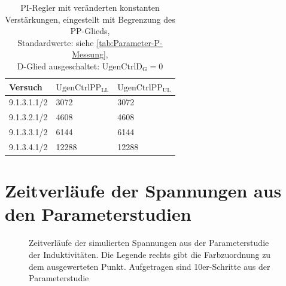 \begin{longtable}[]{lll}
    \caption{PI-Regler mit veränderten konstanten Verstärkungen, eingestellt mit Begrenzung des PP-Glieds,\\Standardwerte: siehe \cref{tab:Parameter-P-Messung},\\D-Glied ausgeschaltet: $\mathrm{UgenCtrlD_G=0}$}
    \label{tab:Parameter-PI-Messung}
    \tabularnewline
    \toprule
    Versuch     & $\mathrm{UgenCtrlPP_{LL}}$ & $\mathrm{UgenCtrlPP_{UL}}$ \\
    \midrule
    \endhead
        9.1.3.1.1/2 & 3072         & 3072  \\
        9.1.3.2.1/2 & 4608         & 4608  \\
        9.1.3.3.1/2 & 6144         & 6144  \\
        9.1.3.4.1/2 & 12288        & 12288 \\
    \bottomrule
\end{longtable}

\section{Zeitverläufe der Spannungen aus den Parameterstudien}
\begin{figure}[!ht]
    \centering
    \begin{subfigure}{\linewidth}
        \centering
        \label{fig:InduktivitatenSweepA}
    \end{subfigure}
    \caption{Zeitverläufe der simulierten Spannungen aus der Parameterstudie der Induktivitäten. Die Legende rechts gibt die Farbzuordnung zu dem ausgewerteten Punkt. Aufgetragen sind 10er-Schritte aus der Parameterstudie}
\end{figure}

